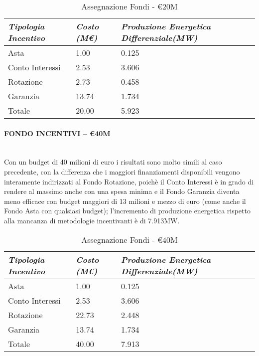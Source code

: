 \documentclass[12pt,a4paper,openright,twoside]{report}
\newcommand{\myparagraph}[1]{\paragraph{#1}\mbox{}\\}
\begin{document}
\begin{table}[h]
\centering
	\begin{tabular}{ p{}  | p{} | p{}  }
		\hline \hline 
		\nohyphens{\emph{Tipologia Incentivo}} & \nohyphens{\emph{Costo (M\euro)}} & \nohyphens{\emph{Produzione Energetica Differenziale(MW)}} \\ \hline
		Asta &  1.00 & 0.125 \\ 
		Conto Interessi & 2.53 & 3.606 \\ 
		Rotazione & 2.73 & 0.458 \\ 
		Garanzia & 13.74 & 1.734 \\ \hline 
		Totale & 20.00 & 5.923 \\
		\hline 
	\end{tabular}
	\caption{Assegnazione Fondi - \euro20M}
	\label{tab:assegnFondi20M}	
\end{table}

\myparagraph{FONDO INCENTIVI – \euro40M}

Con un budget di 40 milioni di euro i risultati sono molto simili al caso precedente, con la differenza che i maggiori finanziamenti disponibili vengono interamente indirizzati al Fondo Rotazione, poichè il Conto Interessi è in grado di rendere al massimo anche con una spesa minima e il Fondo Garanzia diventa meno efficace con budget maggiori di 13 milioni e mezzo di euro (come anche il Fondo Asta con qualsiasi budget); l'incremento di produzione energetica rispetto alla mancanza di metodologie incentivanti è di 7.913MW.

\begin{table}[h]
\centering
	\begin{tabular}{ p{}  | p{} | p{}  }
		\hline \hline 
		\nohyphens{\emph{Tipologia Incentivo}} & \nohyphens{\emph{Costo (M\euro)}} & \nohyphens{\emph{Produzione Energetica Differenziale(MW)}} \\ \hline
		Asta &  1.00 & 0.125 \\ 
		Conto Interessi & 2.53 & 3.606 \\ 
		Rotazione & 22.73 & 2.448 \\ 
		Garanzia & 13.74 & 1.734 \\ \hline 
		Totale & 40.00 & 7.913 \\
		\hline 
	\end{tabular}
	\caption{Assegnazione Fondi - \euro40M}
	\label{tab:assegnFondi40M}	
\end{table}

\nocite{*}


\end{document}
